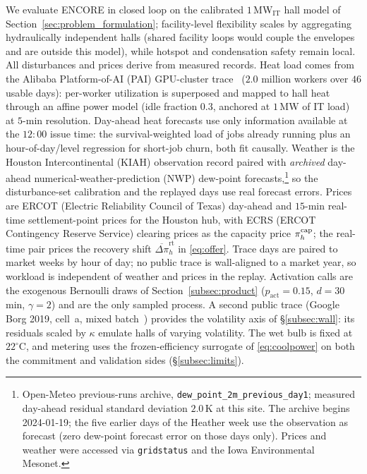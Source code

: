 We evaluate ENCORE in closed loop on the calibrated $1$\,MW$_{\mathrm{IT}}$
hall model of Section~\ref{sec:problem_formulation}; facility-level
flexibility scales
by aggregating hydraulically independent halls (shared facility loops would
couple the envelopes and are outside this model), while hotspot and
condensation safety remain local. All disturbances and prices derive from
measured records. Heat load comes from the Alibaba Platform-of-AI (PAI)
GPU-cluster trace~\cite{weng2022mlaas} ($2.0$ million workers over $46$
usable days): per-worker utilization is superposed and mapped to hall heat
through an affine power model (idle fraction $0.3$, anchored at $1$\,MW of
IT load) at $5$-min resolution. Day-ahead heat forecasts use only
information available at the $12{:}00$ issue time: the survival-weighted
load of jobs already running plus an hour-of-day/level regression for
short-job churn, both fit causally. Weather is the Houston Intercontinental
(KIAH) observation record paired with \emph{archived} day-ahead
numerical-weather-prediction (NWP) dew-point forecasts,\footnote{Open-Meteo
previous-runs archive, \texttt{dew\_point\_2m\_previous\_day1}; measured
day-ahead residual standard deviation $2.0$\,K at this site. The archive
begins 2024-01-19; the five earlier days of the Heather week use the
observation as forecast (zero dew-point forecast error on those days only).
Prices and weather were accessed via \texttt{gridstatus} and the Iowa
Environmental Mesonet.} so the disturbance-set calibration and the replayed
days use real forecast errors. Prices are ERCOT (Electric Reliability
Council of Texas) day-ahead and $15$-min real-time settlement-point prices
for the Houston hub, with ECRS (ERCOT Contingency Reserve Service) clearing
prices as the capacity price $\pi^{\mathrm{cap}}_h$; the real-time pair prices the
recovery shift $\overline{\Delta\pi}^{\mathrm{rt}}_h$ in \eqref{eq:offer}.
Trace days are paired to market weeks by hour of day; no public trace is
wall-aligned to a market year, so workload is independent of weather and
prices in the replay. Activation calls are the exogenous Bernoulli
draws of Section~\ref{subsec:product} ($p_{\mathrm{act}}=0.15$,
$d=30$\,min, $\gamma=2$) and are the only sampled process. A second public
trace (Google Borg 2019, cell~a, mixed batch~\cite{tirmazi2020borg})
provides the volatility axis of \S\ref{subsec:wall}: its residuals scaled
by $\kappa$ emulate halls of varying volatility. The wet bulb is fixed at
$22^\circ$C, and metering uses the frozen-efficiency surrogate of
\eqref{eq:coolpower} on both the commitment and validation sides
(\S\ref{subsec:limits}).

